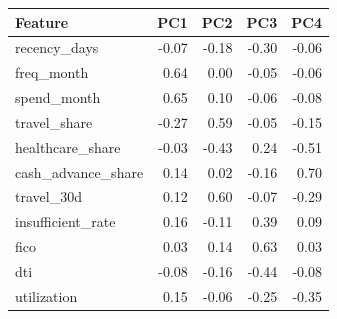 \documentclass[11pt,a4paper]{article}
\begin{document}
\begin{center}
\small
\setlength{\tabcolsep}{4pt}
\newcommand{\hc}[1]{\pgfmathtruncatemacro{\ha}{min(80,abs(#1)*100)}\global\let\hag\ha\ifdim #1pt>0pt\cellcolor{cb!\hag}\else\cellcolor{cr!\hag}\fi #1}
\begin{tabular}{@{}lrrrr@{}}
\toprule
\textbf{Feature} & \textbf{PC1} & \textbf{PC2} & \textbf{PC3} & \textbf{PC4}\\
\midrule
recency\_days & \hc{-0.07} & \hc{-0.18} & \hc{-0.30} & \hc{-0.06}\\
freq\_month & \hc{0.64} & \hc{0.00} & \hc{-0.05} & \hc{-0.06}\\
spend\_month & \hc{0.65} & \hc{0.10} & \hc{-0.06} & \hc{-0.08}\\
travel\_share & \hc{-0.27} & \hc{0.59} & \hc{-0.05} & \hc{-0.15}\\
healthcare\_share & \hc{-0.03} & \hc{-0.43} & \hc{0.24} & \hc{-0.51}\\
cash\_advance\_share & \hc{0.14} & \hc{0.02} & \hc{-0.16} & \hc{0.70}\\
travel\_30d & \hc{0.12} & \hc{0.60} & \hc{-0.07} & \hc{-0.29}\\
insufficient\_rate & \hc{0.16} & \hc{-0.11} & \hc{0.39} & \hc{0.09}\\
fico & \hc{0.03} & \hc{0.14} & \hc{0.63} & \hc{0.03}\\
dti & \hc{-0.08} & \hc{-0.16} & \hc{-0.44} & \hc{-0.08}\\
utilization & \hc{0.15} & \hc{-0.06} & \hc{-0.25} & \hc{-0.35}\\
\bottomrule
\end{tabular}
\end{center}
\end{document}
